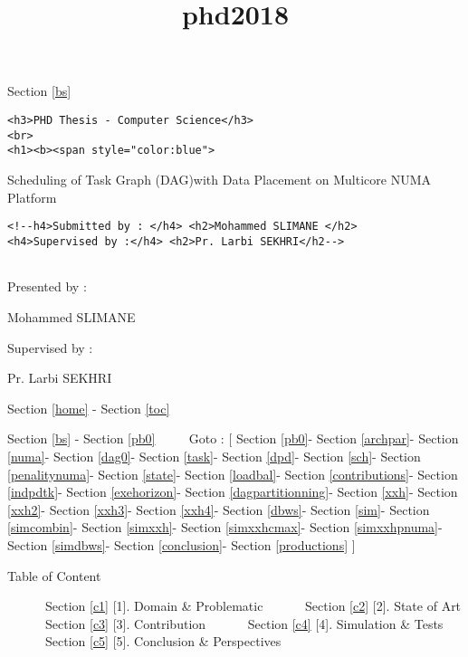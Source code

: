 \documentclass[11pt]{article}
\title{phd2018}
\begin{document}
    
    
    \maketitle
    
    

    
     Section \ref{bs}

\begin{verbatim}
<h3>PHD Thesis - Computer Science</h3>
<br>
<h1><b><span style="color:blue">
\end{verbatim}

Scheduling of Task Graph (DAG)with Data Placement on Multicore NUMA
Platform

\begin{verbatim}
<!--h4>Submitted by : </h4> <h2>Mohammed SLIMANE </h2>
<h4>Supervised by :</h4> <h2>Pr. Larbi SEKHRI</h2-->   
\end{verbatim}

\begin{longtable}[]{@{}ll@{}}
\toprule
\bottomrule
\end{longtable}

\textbar{}

Presented by :

Mohammed SLIMANE

\textbar{}

Supervised by :

Pr. Larbi SEKHRI

\textbar{} 

    Section \ref{home} - Section \ref{toc}

 

     {Section \ref{bs} - Section \ref{pb0} ~~~~ Goto : {[}
Section \ref{pb0}- Section \ref{archpar}- Section \ref{numa}-
Section \ref{dag0}- Section \ref{task}- Section \ref{dpd}-
Section \ref{sch}- Section \ref{penalitynuma}- Section \ref{state}-
Section \ref{loadbal}- Section \ref{contributions}-
Section \ref{indpdtk}- Section \ref{exehorizon}-
Section \ref{dagpartitionning}- Section \ref{xxh}- Section \ref{xxh2}-
Section \ref{xxh3}- Section \ref{xxh4}- Section \ref{dbws}-
Section \ref{sim}- Section \ref{simcombin}- Section \ref{simxxh}-
Section \ref{simxxhcmax}- Section \ref{simxxhpnuma}-
Section \ref{simdbws}- Section \ref{conclusion}-
Section \ref{productions} {]} }

Table of Content

~~~~~~Section \ref{c1} {[}1{]}. Domain \& Problematic
~~~~~~Section \ref{c2} {[}2{]}. State of Art ~~~~~~Section \ref{c3}
{[}3{]}. Contribution ~~~~~~Section \ref{c4} {[}4{]}. Simulation \&
Tests ~~~~~~Section \ref{c5} {[}5{]}. Conclusion \& Perspectives 
\end{document}
